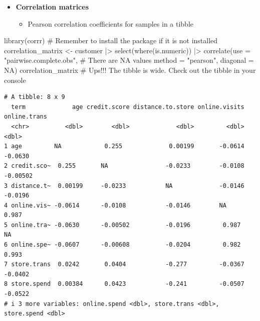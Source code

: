 \documentclass[
  ignorenonframetext,
]{beamer}
\newenvironment{Shaded}{\begin{snugshade}}{\end{snugshade}}
\newcommand{\AttributeTok}[1]{\textcolor[rgb]{0.40,0.45,0.13}{#1}}
\newcommand{\CommentTok}[1]{\textcolor[rgb]{0.37,0.37,0.37}{#1}}
\newcommand{\ConstantTok}[1]{\textcolor[rgb]{0.56,0.35,0.01}{#1}}
\newcommand{\FunctionTok}[1]{\textcolor[rgb]{0.28,0.35,0.67}{#1}}
\newcommand{\NormalTok}[1]{\textcolor[rgb]{0.00,0.23,0.31}{#1}}
\newcommand{\OtherTok}[1]{\textcolor[rgb]{0.00,0.23,0.31}{#1}}
\newcommand{\SpecialCharTok}[1]{\textcolor[rgb]{0.37,0.37,0.37}{#1}}
\newcommand{\StringTok}[1]{\textcolor[rgb]{0.13,0.47,0.30}{#1}}
\providecommand{\tightlist}{%
  \setlength{\itemsep}{0pt}\setlength{\parskip}{0pt}}\usepackage{longtable,booktabs,array}
\begin{document}
\begin{frame}[fragile]{}
\label{section-19}
\begin{itemize}
\item
  \textbf{Correlation matrices}

  \begin{itemize}
  \tightlist
  \item
    Pearson correlation coefficients for samples in a tibble
  \end{itemize}
\end{itemize}

\tiny

\begin{Shaded}
\begin{Highlighting}[]
\FunctionTok{library}\NormalTok{(corrr) }\CommentTok{\# Remember to install the package if it is not installed}
\NormalTok{correlation\_matrix }\OtherTok{\textless{}{-}}\NormalTok{ customer }\SpecialCharTok{|\textgreater{}} 
  \FunctionTok{select}\NormalTok{(}\FunctionTok{where}\NormalTok{(is.numeric)) }\SpecialCharTok{|\textgreater{}} 
  \FunctionTok{correlate}\NormalTok{(}\AttributeTok{use =} \StringTok{"pairwise.complete.obs"}\NormalTok{, }\CommentTok{\# There are NA values}
            \AttributeTok{method =} \StringTok{"pearson"}\NormalTok{,}
            \AttributeTok{diagonal =} \ConstantTok{NA}\NormalTok{)}
\NormalTok{correlation\_matrix }\CommentTok{\# Ups!!! The tibble is wide. Check out the tibble in your console}
\end{Highlighting}
\end{Shaded}

\begin{verbatim}
# A tibble: 8 x 9
  term             age credit.score distance.to.store online.visits online.trans
  <chr>          <dbl>        <dbl>             <dbl>         <dbl>        <dbl>
1 age         NA            0.255             0.00199       -0.0614     -0.0630 
2 credit.sco~  0.255       NA                -0.0233        -0.0108     -0.00502
3 distance.t~  0.00199     -0.0233           NA             -0.0146     -0.0196 
4 online.vis~ -0.0614      -0.0108           -0.0146        NA           0.987  
5 online.tra~ -0.0630      -0.00502          -0.0196         0.987      NA      
6 online.spe~ -0.0607      -0.00608          -0.0204         0.982       0.993  
7 store.trans  0.0242       0.0404           -0.277         -0.0367     -0.0402 
8 store.spend  0.00384      0.0423           -0.241         -0.0507     -0.0522 
# i 3 more variables: online.spend <dbl>, store.trans <dbl>, store.spend <dbl>
\end{verbatim}
\end{frame}
\end{document}
